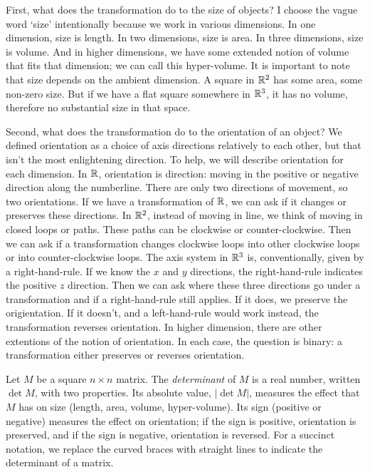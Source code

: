 \documentclass[fleqn]{report}
\begin{document}
First, what does the transformation do to the size of objects?
I choose the vague word `size' intentionally because we work
in various dimensions. In one dimension, size is length. In
two dimensions, size is area. In three dimensions, size is
volume. And in higher dimensions, we have some extended
notion of volume that fits that dimension; we can call this
hyper-volume. It is important to note that size depends on
the ambient dimension. A square in $\mathbb{R}^2$ has some area,
some non-zero size. But if we have a flat square somewhere in
$\mathbb{R}^3$, it has no volume, therefore no substantial size in
that space. 

Second, what does the transformation do to the orientation of
an object? We defined orientation as a choice of axis
directions relatively to each other, but that isn't the most
enlightening direction. To help, we will describe orientation
for each dimension. In $\mathbb{R}$, orientation is direction: moving
in the positive or negative direction along the numberline.
There are only two directions of movement, so two
orientations. If we have a transformation of $\mathbb{R}$, we can ask
if it changes or preserves these directions. In $\mathbb{R}^2$,
instead of moving in line, we think of moving in closed loops
or paths. These paths can be clockwise or counter-clockwise.
Then we can ask if a transformation changes clockwise loops
into other clockwise loops or into counter-clockwise loops.
The axis system in $\mathbb{R}^3$ is, conventionally, given by a
right-hand-rule. If we know the $x$ and $y$ directions, the
right-hand-rule indicates the positive $z$ direction. Then we
can ask where these three directions go under a transformation
and if a right-hand-rule still applies. If it does, we
preserve the origientation. If it doesn't, and a
left-hand-rule would work instead, the transformation reverses
orientation. In higher dimension, there are other extentions
of the notion of orientation. In each case, the question is
binary: a transformation either preserves or reverses
orientation.

\begin{defn}
Let $M$ be a square $n \times n$ matrix. The
\emph{determinant} of $M$ is a real number, written $\det M$,
with two properties. Its absolute value, $|\det M|$, measures
the effect that $M$ has on size (length, area, volume,
hyper-volume). Its sign (positive or negative) measures the
effect on orientation; if the sign is positive, orientation is
preserved, and if the sign is negative, orientation is
reversed. For a succinct notation, we replace the curved
braces with straight lines to indicate the determinant of a
matrix. 
\end{defn}
\end{document}
